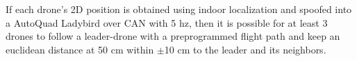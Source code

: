 If each drone's 2D position is obtained using indoor localization and spoofed into a AutoQuad Ladybird over CAN with 5 hz, then it is possible for at least 3 drones to follow a leader-drone with a preprogrammed flight path and keep an euclidean distance at 50 cm within $\pm$10 cm to the leader and its neighbors.